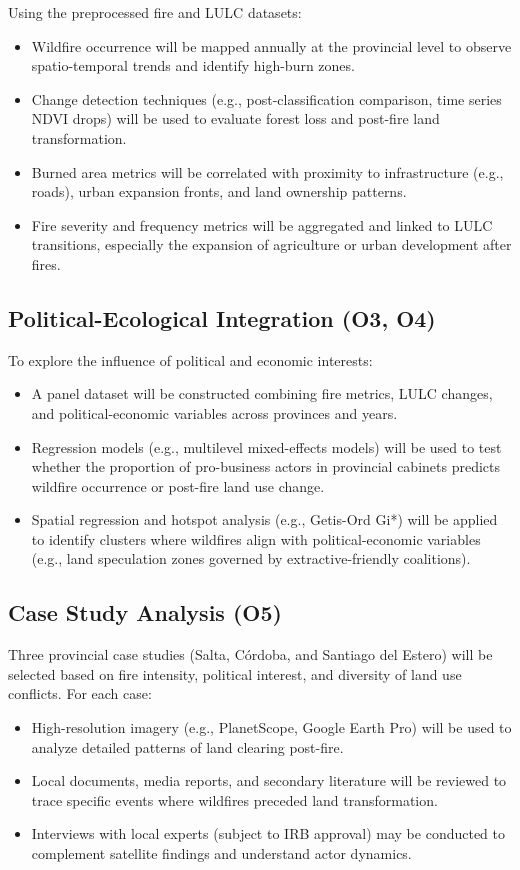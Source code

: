 Using the preprocessed fire and LULC datasets:
\begin{itemize}
    \item Wildfire occurrence will be mapped annually at the provincial level to observe spatio-temporal trends and identify high-burn zones.
    \item Change detection techniques (e.g., post-classification comparison, time series NDVI drops) will be used to evaluate forest loss and post-fire land transformation.
    \item Burned area metrics will be correlated with proximity to infrastructure (e.g., roads), urban expansion fronts, and land ownership patterns.
    \item Fire severity and frequency metrics will be aggregated and linked to LULC transitions, especially the expansion of agriculture or urban development after fires.
\end{itemize}

\subsection{Political-Ecological Integration (O3, O4)}

To explore the influence of political and economic interests:
\begin{itemize}
    \item A panel dataset will be constructed combining fire metrics, LULC changes, and political-economic variables across provinces and years.
    \item Regression models (e.g., multilevel mixed-effects models) will be used to test whether the proportion of pro-business actors in provincial cabinets predicts wildfire occurrence or post-fire land use change.
    \item Spatial regression and hotspot analysis (e.g., Getis-Ord Gi*) will be applied to identify clusters where wildfires align with political-economic variables (e.g., land speculation zones governed by extractive-friendly coalitions).
\end{itemize}

\subsection{Case Study Analysis (O5)}

Three provincial case studies (Salta, Córdoba, and Santiago del Estero) will be selected based on fire intensity, political interest, and diversity of land use conflicts. For each case:
\begin{itemize}
    \item High-resolution imagery (e.g., PlanetScope, Google Earth Pro) will be used to analyze detailed patterns of land clearing post-fire.
    \item Local documents, media reports, and secondary literature will be reviewed to trace specific events where wildfires preceded land transformation.
    \item Interviews with local experts (subject to IRB approval) may be conducted to complement satellite findings and understand actor dynamics.
\end{itemize}

